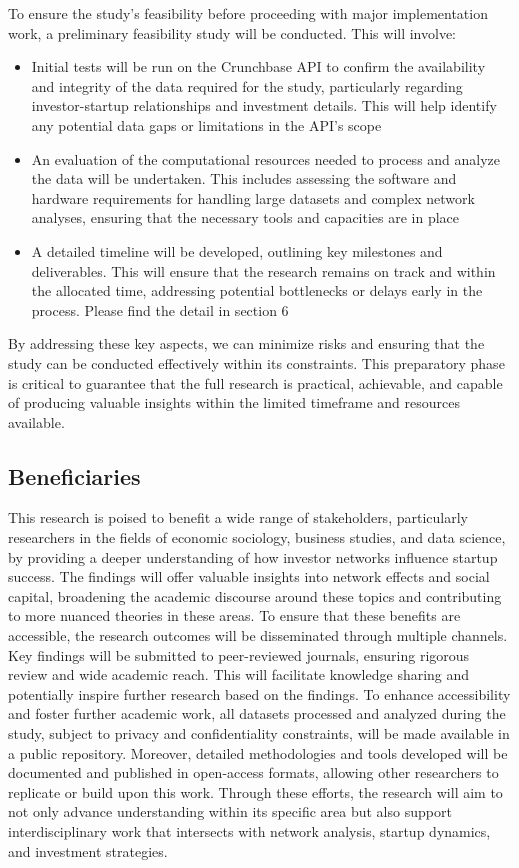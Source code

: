 \documentclass[a4paper,11pt]{article}
\begin{document}
To ensure the study's feasibility before proceeding with major implementation work, a preliminary feasibility study will be conducted. This will involve:
\begin{itemize}
    \item Initial tests will be run on the Crunchbase API to confirm the availability and integrity of the data required for the study, particularly regarding investor-startup relationships and investment details. This will help identify any potential data gaps or limitations in the API's scope
    \item An evaluation of the computational resources needed to process and analyze the data will be undertaken. This includes assessing the software and hardware requirements for handling large datasets and complex network analyses, ensuring that the necessary tools and capacities are in place
    \item A detailed timeline will be developed, outlining key milestones and deliverables. This will ensure that the research remains on track and within the allocated time, addressing potential bottlenecks or delays early in the process. Please find the detail in section 6
\end{itemize}

By addressing these key aspects, we can minimize risks and ensuring that the study can be conducted effectively within its constraints. This preparatory phase is critical to guarantee that the full research is practical, achievable, and capable of producing valuable insights within the limited timeframe and resources available.

\subsection{Beneficiaries}

This research is poised to benefit a wide range of stakeholders, particularly researchers in the fields of economic sociology, business studies, and data science, by providing a deeper understanding of how investor networks influence startup success. The findings will offer valuable insights into network effects and social capital, broadening the academic discourse around these topics and contributing to more nuanced theories in these areas. To ensure that these benefits are accessible, the research outcomes will be disseminated through multiple channels. Key findings will be submitted to peer-reviewed journals, ensuring rigorous review and wide academic reach. This will facilitate knowledge sharing and potentially inspire further research based on the findings. To enhance accessibility and foster further academic work, all datasets processed and analyzed during the study, subject to privacy and confidentiality constraints, will be made available in a public repository. Moreover, detailed methodologies and tools developed will be documented and published in open-access formats, allowing other researchers to replicate or build upon this work. Through these efforts, the research will aim to not only advance understanding within its specific area but also support interdisciplinary work that intersects with network analysis, startup dynamics, and investment strategies.
\end{document}
